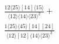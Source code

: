 \documentclass[varwidth, border=5pt]{standalone}
\begin{document}
\begin{my}
$\begin{gathered}
\scriptscriptstyle\frac{12⟨25⟩[14]⟨15⟩}{⟨12⟩⟨14⟩⟨23⟩^2}+\\
\scriptscriptstyle\frac{1⟨25⟩⟨45⟩[14][24]}{⟨12⟩[12]⟨14⟩⟨23⟩^2}\phantom{+}
\end{gathered}$
\end{my}
\end{document}

